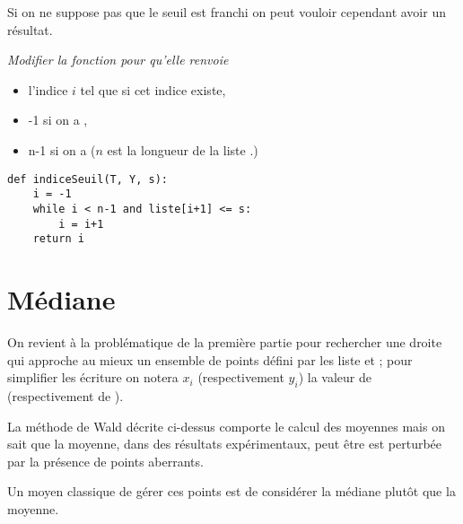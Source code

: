 Si on ne suppose pas que le seuil est franchi on peut vouloir cependant avoir un résultat. 
\begin{Exercise}\it Modifier la fonction  pour qu'elle renvoie 
\begin{itemize}
    \item l'indice $i$ tel que  si cet indice existe,
    \item -1 si on a ,
    \item n-1 si on a  ($n$ est la longueur de la liste .)
\end{itemize}
\end{Exercise}
\begin{Answer}
\begin{lstlisting}
def indiceSeuil(T, Y, s):
    i = -1
    while i < n-1 and liste[i+1] <= s:
        i = i+1
    return i
\end{lstlisting}
\end{Answer}
\newpage
\section{Médiane} 
On revient à la problématique de la première partie pour rechercher une droite qui approche au mieux un ensemble de points défini par les liste  et  ; pour simplifier les écriture on notera $x_i$ (respectivement $y_i$) la valeur de  (respectivement de ).

La méthode de Wald décrite ci-dessus comporte le calcul des moyennes mais on sait que la moyenne, dans des résultats expérimentaux, peut être est perturbée par la présence de points aberrants.

Un moyen classique de gérer ces points est de considérer la médiane plutôt que la moyenne.

